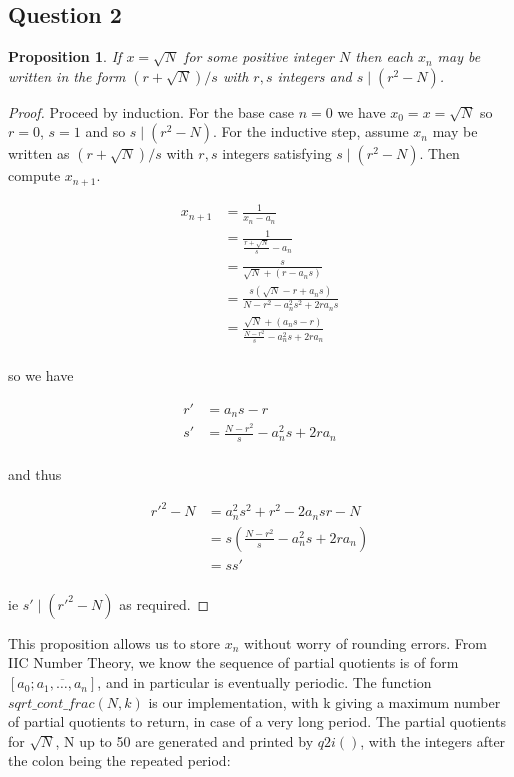 \documentclass[10pt,a4paper]{report}
\newtheorem*{prop}{Proposition}
\begin{document}
\subsection*{Question 2}

\begin{prop}
If $x =\sqrt{N}$ for some positive integer $N$ then each $x_n$ may be written in the form $(r +\sqrt{N})/s$ with $r, s$ integers and $s \mid (r^
2 - N)$.
\end{prop}

\begin{proof}

Proceed by induction. For the base case $n=0$ we have $x_0=x=\sqrt{N}$ so $r=0$, $s=1$ and so $s \mid (r^2 - N)$. For the inductive step, assume $x_n$ may be written as $(r +\sqrt{N})/s$ with $r,s$ integers satisfying $s \mid (r^2 - N)$. Then compute $x_{n+1}$. 

\begin{align*}
x_{n+1} &= \frac{1}{x_n-a_n}\\
		&= \frac{1}{\frac{r+\sqrt{N}}{s}-a_n}\\
		&= \frac{s}{\sqrt{N}+(r-a_ns)}\\
		&= \frac{s(\sqrt{N}-r+a_ns)}{N-r^2-a_n^2s^2+2ra_ns}\\
		&= \frac{\sqrt{N}+(a_ns-r)}{\frac{N-r^2}{s}-a_n^2s+2ra_n}\\
\end{align*}

so we have 

\begin{align*}
r' &= a_ns-r\\
s'	&= \frac{N-r^2}{s}-a_n^2s+2ra_n\\
\end{align*}

and thus 

\begin{align*}
r'^2-N &= a_n^2s^2+r^2-2a_nsr-N\\
	&= s(\frac{N-r^2}{s}-a_n^2s+2ra_n)\\
	&= ss'\\
\end{align*}

ie $s' \mid (r'^2 - N)$ as required.

\end{proof}

This proposition allows us to store $x_n$ without worry of rounding errors. From IIC Number Theory, we know the sequence of partial quotients is of form $[a_0;\overline{a_1,\dots,a_n}]$, and in particular is  eventually periodic. The function $sqrt\_cont\_frac(N,k)$ is our implementation, with k giving a maximum number of partial quotients to return, in case of a very long period. The partial quotients for $\sqrt{N}$, N up to 50 are generated and printed by $q2i()$, with the integers after the colon being the repeated period:
\end{document}
